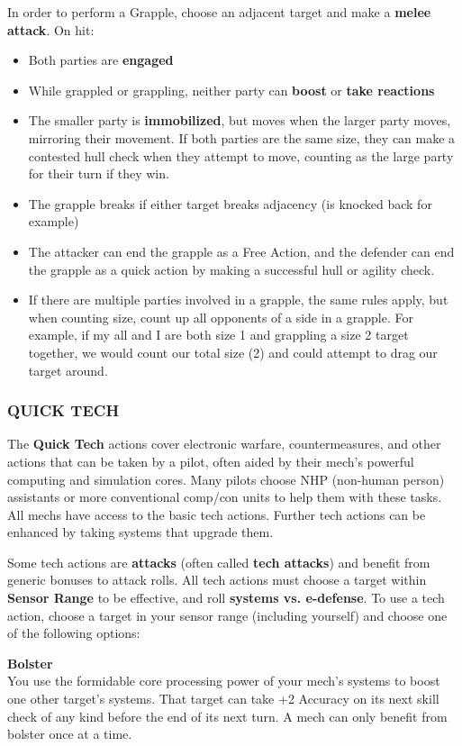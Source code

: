In order to perform a Grapple, choose an adjacent target and make a \textbf{melee attack}. On hit:
\begin{itemize}
    \item Both parties are \textbf{engaged}
    \item While grappled or grappling, neither party can \textbf{boost} or \textbf{take reactions}
    \item The smaller party is \textbf{immobilized}, but moves when the larger party moves, mirroring their movement. If both parties are the same size, they can make a contested hull check when they attempt to move, counting as the large party for their turn if they win.
    \item The grapple breaks if either target breaks adjacency (is knocked back for example)
    \item The attacker can end the grapple as a Free Action, and the defender can end the grapple as a quick action by making a successful hull or agility check.
    \item If there are multiple parties involved in a grapple, the same rules apply, but when counting size, count up all opponents of a side in a grapple. For example, if my all and I are both size 1 and grappling a size 2 target together, we would count our total size (2) and could attempt to drag our target around. 
\end{itemize}

\subsubsection{QUICK TECH}
The \textbf{Quick Tech} actions cover electronic warfare, countermeasures, and other actions that can be taken by a pilot, often aided by their mech’s powerful computing and simulation cores. Many pilots choose NHP (non-human person) assistants or more conventional comp/con units to help them with these tasks. All mechs have access to the basic tech actions. Further tech actions can be enhanced by taking systems that upgrade them. 


Some tech actions are \textbf{attacks} (often called \textbf{tech attacks}) and benefit from generic bonuses to attack rolls. All tech actions must choose a target within \textbf{Sensor Range} to be effective, and roll \textbf{systems vs. e-defense}. To use a tech action, choose a target in your sensor range (including yourself) and choose one of the following options:

\textbf{Bolster}\\
You use the formidable core processing power of your mech’s systems to boost one other target’s systems. That target can take +2 Accuracy on its next skill check of any kind before the end of its next turn. A mech can only benefit from bolster once at a time.

